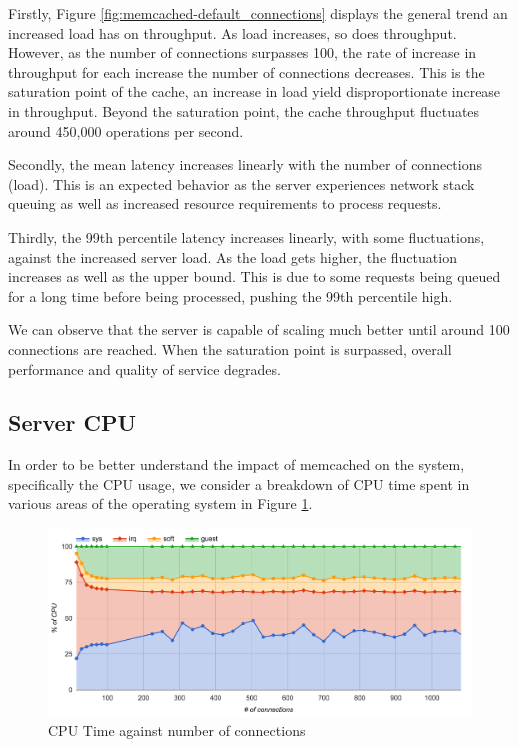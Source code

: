 Firstly, Figure \ref{fig:memcached-default_connections} displays the general trend an increased load has on throughput. As load increases, so does throughput. However, as the number of connections surpasses 100, the rate of increase in throughput for each increase the number of connections decreases. This is the saturation point of the cache, an increase in load yield disproportionate increase in throughput. Beyond the saturation point, the cache throughput fluctuates around 450,000 operations per second.

Secondly, the mean latency increases linearly with the number of connections (load). This is an expected behavior as the server experiences network stack queuing as well as increased resource requirements to process requests.

Thirdly, the 99th percentile latency increases linearly, with some fluctuations, against the increased server load. As the load gets higher, the fluctuation increases as well as the upper bound. This is due to some requests being queued for a long time before being processed, pushing the 99th percentile high.

We can observe that the server is capable of scaling much better until around 100 connections are reached. When the saturation point is surpassed, overall performance and quality of service degrades.


\subsection{Server CPU}
In order to be better understand the impact of memcached on the system, specifically the CPU usage, we consider a breakdown of CPU time spent in various areas of the operating system in Figure \ref{fig:memcached-default-cpu}.

\begin{figure}[h]
    \includegraphics[width=\textwidth]{./res/5_default_cpu.png}
    \caption{CPU Time against number of connections}
    \label{fig:memcached-default-cpu}
\end{figure}

